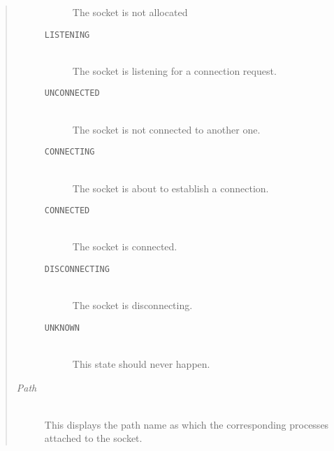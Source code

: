 \begin{appendix}
\begin{english}
\begin{quote}
\begin{description}
\begin{description}
					The socket is not allocated
				\item[{\tt LISTENING}]\mbox{}\\
					The socket is listening for a connection request.
				\item[{\tt UNCONNECTED}]\mbox{}\\
					The socket is not connected to another one.
				\item[{\tt CONNECTING}]\mbox{}\\
					The socket is about to establish a connection.
				\item[{\tt CONNECTED}]\mbox{}\\
					The socket is connected.
				\item[{\tt DISCONNECTING}]\mbox{}\\
					The socket is disconnecting.
				\item[{\tt UNKNOWN}]\mbox{}\\
					This state should never happen.
			\end{description}
		\item[{\sl Path}]\mbox{}\\
			This displays the path name as which the corresponding
			processes attached to the socket.
	\end{description}


\end{quote}
\end{english}
\end{appendix}
